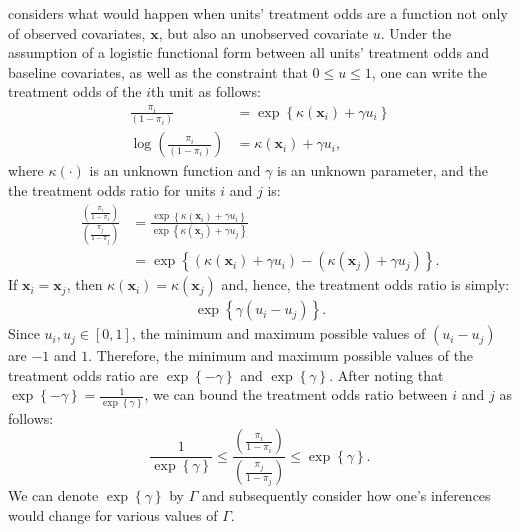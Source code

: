 \documentclass[11pt,leqno]{article}\usepackage[]{graphicx}\usepackage[]{color}
\theoremstyle{newstyle}
\begin{document}
\citet{rosenbaum2002observational} considers what would happen when units' treatment odds are a function not only of observed covariates, $\mathbf{x}$, but also an unobserved covariate $u$. Under the assumption of a logistic functional form between all units' treatment odds and baseline covariates, as well as the constraint that $0 \leq u \leq 1$, one can write the treatment odds of the $i$th unit as follows:
\begin{align*}
\frac{\pi_i}{\left(1 - \pi_i\right)} & = \exp\left\{\kappa\left(\mathbf{x}_i\right) + \gamma u_i\right\} \\ 
\log\left(\frac{\pi_i}{\left(1 - \pi_i\right)}\right) & = \kappa\left(\mathbf{x}_i\right) + \gamma u_i,
\end{align*}
where $\kappa\left(\cdot\right)$ is an unknown function and $\gamma$ is an unknown parameter, and the the treatment odds ratio for units $i$ and $j$ is:
\begin{align*}
\frac{\left(\frac{\pi_i}{1 - \pi_i}\right)}{\left(\frac{\pi_j}{1 - \pi_j}\right)} & = \frac{\exp\left\{\kappa\left(\mathbf{x}_i\right) + \gamma u_i\right\}}{\exp\left\{\kappa\left(\mathbf{x}_j\right) + \gamma u_j\right\}} \\
& = \exp\left\{\left(\kappa\left(\mathbf{x}_i\right) + \gamma u_i\right) - \left(\kappa\left(\mathbf{x}_j\right) + \gamma u_j\right)\right\}.
\end{align*}
If $\mathbf{x}_i = \mathbf{x}_j$, then $\kappa\left(\mathbf{x}_i\right) = \kappa\left(\mathbf{x}_j\right)$ and, hence, the treatment odds ratio is simply:
\begin{align*}
\exp\left\{\gamma \left(u_i -  u_j\right)\right\}.
\end{align*}
Since $u_i, u_j \in \left[0, 1\right]$, the minimum and maximum possible values of $\left(u_i -  u_j\right)$ are $-1$ and $1$. Therefore, the minimum and maximum possible values of the treatment odds ratio are $\exp\left\{-\gamma\right\}$ and $\exp\left\{\gamma\right\}$. After noting that $\exp\left\{-\gamma\right\} = \frac{1}{\exp\left\{\gamma\right\}}$, we can bound the treatment odds ratio between $i$ and $j$ as follows:
\begin{equation}
\frac{1}{\exp\left\{\gamma\right\}} \leq \frac{\left(\frac{\pi_i}{1 - \pi_i}\right)}{\left(\frac{\pi_j}{1 - \pi_j}\right)} \leq \exp\left\{\gamma\right\}.
\end{equation}
We can denote $\exp\left\{\gamma\right\}$ by $\Gamma$ and subsequently consider how one's inferences would change for various values of $\Gamma$.
\end{document}
